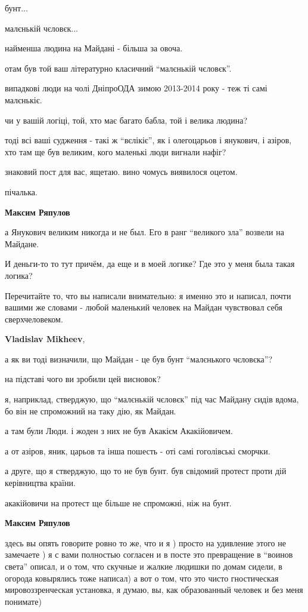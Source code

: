 \begin{itemize}
бунт...

малєнькій чєловєк...

найменша людина на Майдані - більша за овоча.

отам був той ваш літературно класичний \enquote{малєнькій чєловєк}.

випадкові люди на чолі ДніпроОДА зимою 2013-2014 року - теж ті самі малєнькіє.

чи у вашій логіці, той, хто має багато бабла, той і велика людина?

тоді всі ваші судження - такі ж \enquote{вєлікіє}, як і олегоцарьов і янукович, і
азіров, хто там ще був великим, кого маленькі люди вигнали нафіг?

знаковий пост для вас, ящетаю. вино чомусь виявилося оцетом.

пічалька.

\begin{itemize} %
\textbf{Максим Ряпулов} 

а Янукович великим никогда и не был. Его в ранг \enquote{великого зла} возвели на
Майдане.

И деньги-то то тут причём, да еще и в моей логике? Где это у меня была такая
логика?

Перечитайте то, что вы написали внимательно: я именно это и написал, почти
вашими же словами - любой маленький человек на Майдан чувствовал себя
сверхчеловеком.

\textbf{Vladislav Mikheev}, 

а як ви тоді визначили, що Майдан - це був бунт \enquote{малєнького чєловєка}?

на підставі чого ви зробили цей висновок?

я, наприклад, стверджую, що \enquote{малєнькій чєловєк} під час Майдану сидів
вдома, бо він не спроможний на таку дію, як Майдан.

а там були Люди. і жоден з них не був Акакієм Акакійовичем.

а от азіров, яник, царьов та інша пошесть - оті самі гоголівські сморчки.

а друге, що я стверджую, що то не був бунт. був свідомий протест проти дій
керівництва країни.

акакійовичи на протест ще більше не спроможні, ніж на бунт.

\textbf{Максим Ряпулов} 

здесь вы опять говорите ровно то же, что и я ) просто на удивление этого не
замечаете ) я с вами полностью согласен и в посте это превращение в \enquote{воинов
света} описал, и о том, что скучные и жалкие людишки по домам сидели, в огорода
ковырялись тоже написал) а вот о том, что это чисто гностическая
мировоззренческая установка, я думаю, вы, как образованный человек и без меня
понимате)


\end{itemize}
\end{itemize}
